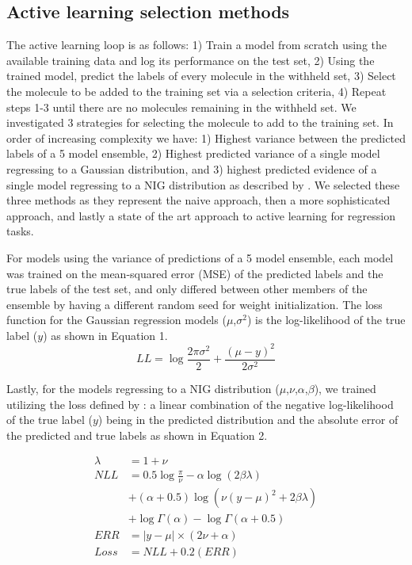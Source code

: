 \documentclass[journal=jmcmar,manuscript=article]{achemso}
\begin{document}
\subsection{Active learning selection methods}
The active learning loop is as follows: 1) Train a model from scratch using the available training data and log its performance on the test set, 2) Using the trained model, predict the labels of every molecule in the withheld set, 3) Select the molecule to be added to the training set via a selection criteria, 4) Repeat steps 1-3 until there are no molecules remaining in the withheld set. We investigated 3 strategies for selecting the molecule to add to the training set. In order of increasing complexity we have: 1) Highest variance between the predicted labels of a 5 model ensemble, 2) Highest predicted variance of a single model regressing to a Gaussian distribution, and 3) highest predicted evidence of a single model regressing to a NIG distribution as described by \citet{alnigregress}. We selected these three methods as they represent the naive approach, then a more sophisticated approach, and lastly a state of the art approach to active learning for regression tasks.

For models using the variance of predictions of a 5 model ensemble, each model was trained on the mean-squared error (MSE) of the predicted labels and the true labels of the test set, and only differed between other members of the ensemble by having a different random seed for weight initialization. The loss function for the Gaussian regression models ($\mu$,$\sigma^2$) is the log-likelihood of the true label ($y$) as shown in Equation 1.
\begin{equation}
    LL = \log \frac{2\pi \sigma^2}{2} + \frac{(\mu - y)^2}{2\sigma^2}
\end{equation}

Lastly, for the models regressing to a NIG distribution ($\mu$,$\nu$,$\alpha$,$\beta$), we trained utilizing the loss defined by \citet{alnigregress}:  a linear combination of the negative log-likelihood of the true label ($y$) being in the predicted distribution and the absolute error of the predicted and true labels as shown in Equation 2. 

\begin{equation}
\begin{split}
\lambda &= 1+\nu \\
NLL &= 0.5\log\frac{\pi}{\nu} - \alpha\log(2\beta\lambda)  \\
 & + (\alpha+0.5)\log(\nu(y-\mu)^2+2\beta\lambda)  \\
 & + \log\Gamma(\alpha) - \log\Gamma(\alpha+0.5)  \\
ERR &= |y-\mu| \times (2\nu + \alpha)  \\
Loss &= NLL + 0.2(ERR)    
\end{split}
\end{equation}
\end{document}
